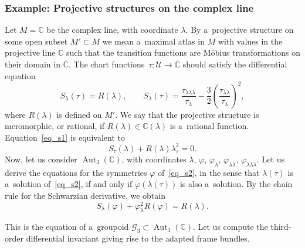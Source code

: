 \documentclass[pdftex]{sigma}
\numberwithin{equation}{section}
\theoremstyle{definition}
\begin{document}
\subsubsection{Example: Projective structures on the complex line}

Let $M= \mathbb C$ be the complex line, with coordinate $\lambda$. By a~projective structure {on} some open subset $M'\subset M$ we mean a~maximal atlas in $M$ with values {in} the projective line $\overline{\mathbb C}$ such that the transition functions are M\"obius transformations on their domain in $\overline{\mathbb C}$. The chart functions~${\tau\colon \mathcal U \to \overline{\mathbb C}}$ should satisfy the differential equation
\begin{equation}\label{eq_s1}
S_\lambda(\tau) = R(\lambda), \qquad S_{\lambda}(\tau) = \frac{\tau_{\lambda\lambda\lambda}}{\tau_\lambda} - \frac{3}{2}\left(\frac{\tau_{\lambda\lambda}}{\tau_{\lambda}}\right)^2,
\end{equation}
where $R(\lambda)$ is defined on $M'$. We say that the projective structure is meromorphic, or rational, if $R(\lambda) \in \mathbb C(\lambda)$ is a~rational function. Equation~\eqref{eq_s1} is equivalent to
\begin{equation}\label{eq_s2}
S_\tau(\lambda) + R(\lambda)\lambda_{\tau}^{2} = 0.
\end{equation}
Now, let us consider $\operatorname{Aut}_3(\mathbb C)$, with coordinates $\lambda$, $\varphi$, $\varphi_{\lambda}$, $\varphi_{\lambda\lambda}$, $\varphi_{\lambda\lambda\lambda}$. Let us derive the equations for the symmetries $\varphi$ of~\eqref{eq_s2}, in the sense that $\lambda(\tau)$ is a~solution of~\eqref{eq_s2}, if and only if $\varphi(\lambda(\tau))$ is also a~solution. By the chain rule for the Schwarzian derivative, we obtain
\begin{equation}\label{eq_kummer}
S_\lambda(\varphi) + \varphi_\lambda^2R(\varphi)=R(\lambda).
\end{equation}

This is the equation of a~groupoid $\mathcal G_3 \subset \operatorname{Aut}_3(\mathbb C)$. Let us compute the third-order differential invariant giving rise to the adapted frame bundles.
\end{document}
